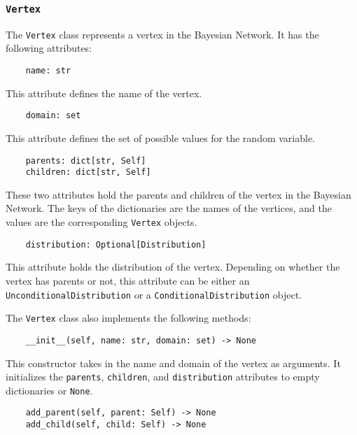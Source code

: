 \documentclass{article}
\theoremstyle{definition}
\begin{document}
\subsubsection{\texttt{Vertex}}

The \texttt{Vertex} class represents a vertex in the Bayesian Network. It has the following attributes:

\begin{verbatim}
    name: str
\end{verbatim}

This attribute defines the name of the vertex.

\begin{verbatim}
    domain: set
\end{verbatim}

This attribute defines the set of possible values for the random variable.

\begin{verbatim}
    parents: dict[str, Self]
    children: dict[str, Self]
\end{verbatim}

These two attributes hold the parents and children of the vertex in the Bayesian Network. The keys of the dictionaries are the names of the vertices, and the values are the corresponding \texttt{Vertex} objects.

\begin{verbatim}
    distribution: Optional[Distribution]
\end{verbatim}

This attribute holds the distribution of the vertex. Depending on whether the vertex has parents or not, this attribute can be either an \texttt{UnconditionalDistribution} or a \texttt{ConditionalDistribution} object.

The \texttt{Vertex} class also implements the following methods:

\begin{verbatim}
    __init__(self, name: str, domain: set) -> None
\end{verbatim}

This constructor takes in the name and domain of the vertex as arguments. It initializes the \texttt{parents}, \texttt{children}, and \texttt{distribution} attributes to empty dictionaries or \texttt{None}.

\begin{verbatim}
    add_parent(self, parent: Self) -> None
    add_child(self, child: Self) -> None
\end{verbatim}
\end{document}
